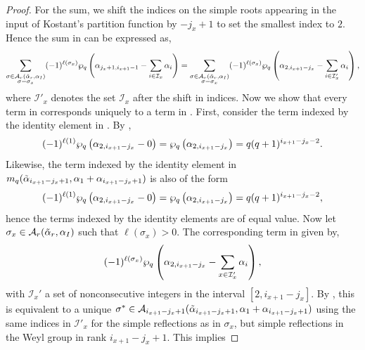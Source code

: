 \documentclass[10pt]{article}
\newcommand{\hr}[0]{\Tilde{\alpha}}
\newcommand{\qpartition}[1]{\wp_q\left(#1\right)}
\begin{document}
\begin{proof}
    For the sum, we shift the indices on the simple roots appearing in the input of Kostant's partition function by $-j_x+1$ to set the smallest index to $2$. Hence the sum in  can be expressed as,
    \begin{equation}
        \sum_{\substack{\sigma\in\mathcal{A}_r(\hr_r,\alpha_I)\\\sigma=\sigma_x}}(-1)^{\ell(\sigma_x)}\qpartition{\alpha_{j_x+1,i_{x+1}-1}-\sum_{i\in\mathcal{I}_x}\alpha_i}=\sum_{\substack{\sigma\in\mathcal{A}_r(\hr_r,\alpha_I)\\\sigma=\sigma_x}}(-1)^{\ell(\sigma_x)}\qpartition{\alpha_{2,i_{x+1}-j_x}-\sum_{i\in\mathcal{I}'_x}\alpha_i},\label{silly sum}
    \end{equation}
    where $\mathcal{I}'_x$ denotes the set $\mathcal{I}_x$ after the shift in indices. 
    Now we show that every term in  corresponds uniquely to a term in .
    First, consider the term indexed by the identity element in . By ,
    \begin{equation}
        (-1)^{\ell(1)}\qpartition{\alpha_{2,i_{x+1}-j_x}-0}=\qpartition{\alpha_{2,i_{x+1}-j_x}}=q(q+1)^{i_{x+1}-j_x-2}.\notag
    \end{equation}
    Likewise, the term indexed by the identity element in $m_q(\hr_{i_{x+1}-j_x+1},\alpha_1+\alpha_{i_{x+1}-j_x+1})$ is also of the form 
    \begin{equation}
        (-1)^{\ell(1)}\qpartition{\alpha_{2,i_{x+1}-j_x}-0}=\qpartition{\alpha_{2,i_{x+1}-j_x}}=q(q+1)^{i_{x+1}-j_x-2},\notag
    \end{equation}
    hence the terms indexed by the identity elements are of equal value. Now let $\sigma_x\in\mathcal{A}_r(\hr_r,\alpha_I)$ such that $\ell(\sigma_x)>0$. The corresponding term in  given by,
    \begin{equation}
        (-1)^{\ell(\sigma_x)}\qpartition{\alpha_{2,i_{x+1}-j_x}-\sum_{x\in\mathcal{I}_x'}\alpha_i},\notag
    \end{equation}
    with $\mathcal{I}_x'$ a set of nonconsecutive integers in the interval $[2,i_{x+1}-j_x]$.
    By , this is equivalent to a unique $\sigma^*\in\mathcal{A}_{i_{x+1}-j_x+1}(\hr_{i_{x+1}-j_x+1},\alpha_1+\alpha_{i_{x+1}-j_x+1})$ using the same indices in $\mathcal{I}'_x$ for the simple reflections as in $\sigma_x$, but simple reflections in the Weyl group in rank $i_{x+1}-j_x+1$. This implies 

\end{proof}
\end{document}
